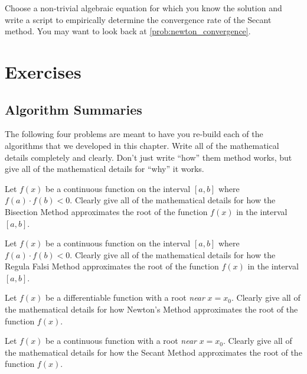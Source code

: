 \begin{problem}
    Choose a non-trivial algebraic equation for which you know the solution and write a
    script to empirically determine the convergence rate of the Secant method.  You may want to
    look back at \ref{prob:newton_convergence}.
\end{problem}





\newpage\section{Exercises}

\subsection{Algorithm Summaries}
The following four problems are meant to have you re-build each of the algorithms that
we developed in this chapter.  Write all of the mathematical details completely and
clearly.  Don't just write ``how'' them method works, but give all of the mathematical
details for ``why'' it works.
\begin{problem}
    Let $f(x)$ be a continuous function on the interval $[a,b]$ where $f(a) \cdot f(b) <
    0$.  Clearly give all of the mathematical details for how the Bisection Method
    approximates the root of the function $f(x)$ in the interval $[a,b]$.  
\end{problem}

\begin{problem}
    Let $f(x)$ be a continuous function on the interval $[a,b]$ where $f(a) \cdot f(b) <
    0$.  Clearly give all of the mathematical details for how the Regula Falsi Method
    approximates the root of the function $f(x)$ in the interval $[a,b]$. 
\end{problem}

\begin{problem}
    Let $f(x)$ be a differentiable function with a root {\it near} $x=x_0$.  Clearly give
    all of the mathematical details for how Newton's Method approximates the root of the
    function $f(x)$.
\end{problem}

\begin{problem}
    Let $f(x)$ be a continuous function with a root {\it near} $x=x_0$.  Clearly give
    all of the mathematical details for how the Secant Method approximates the root of the
    function $f(x)$.
\end{problem}

